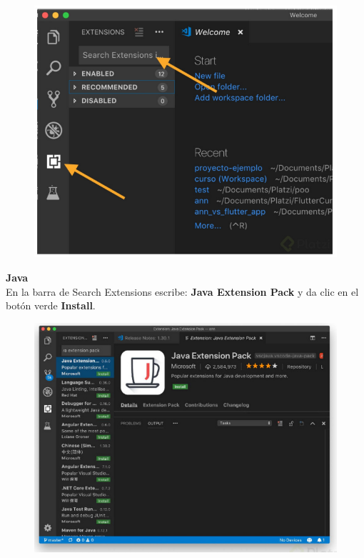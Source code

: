 \documentclass{article}
\begin{document}
\begin{figure}[h!]
  \centering
  \includegraphics[scale=0.65]{./Pictures/023_vscode.png}
\end{figure}

\newpage
\textbf{Java}\\
En la barra de Search Extensions escribe: \textbf{Java Extension Pack} y da clic
en el botón verde \textbf{Install}.

\begin{figure}[h!]
  \centering
  \includegraphics[scale=0.75]{./Pictures/024_vscode.png}
\end{figure}
\end{document}
